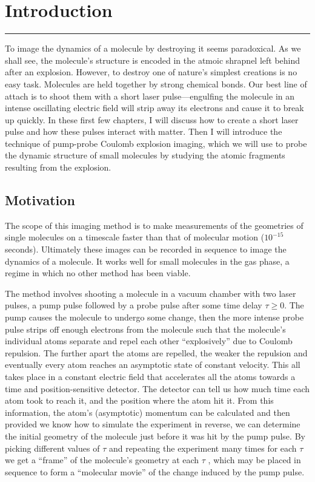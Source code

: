 \chapter{Introduction}\label{ch:introduction}

\vspace{-1.5 em}
\begin{addmargin}[-0.5cm]{0cm}
  \minitoc
\end{addmargin}
\hrule
\vspace{1.5 em}

To image the dynamics of a molecule by destroying it seems paradoxical. As we shall see, the molecule's structure is encoded in the atmoic shrapnel left behind after an explosion. However, to destroy one of nature's simplest creations is no easy task. Molecules are held together by strong chemical bonds. Our best line of attach is to shoot them with a short laser pulse---engulfing the molecule in an intense oscillating electric field will strip away its electrons and cause it to break up quickly. In these first few chapters, I will discuss how to create a short laser pulse and how these pulses interact with matter. Then I will introduce the technique of pump-probe Coulomb explosion imaging, which we will use to probe the dynamic structure of small molecules by studying the atomic fragments resulting from the explosion.

\section{Motivation}
The scope of this imaging method is to make measurements of the geometries of single molecules on a timescale faster than that of molecular motion ($10^{-15}$ seconds). Ultimately these images can be recorded in sequence to image the dynamics of a molecule. It works well for small molecules in the gas phase, a regime in which no other method has been viable.

The method involves shooting a molecule in a vacuum chamber with two laser pulses, a pump pulse followed by a probe pulse after some time delay $\tau \ge 0$. The pump causes the molecule to undergo some change, then the more intense probe pulse strips off enough electrons from the molecule such that the molecule's individual atoms separate and repel each other ``explosively'' due to Coulomb repulsion. The further apart the atoms are repelled, the weaker the repulsion and eventually every atom reaches an asymptotic state of constant velocity. This all takes place in a constant electric field that accelerates all the atoms towards a time and position-sensitive detector. The detector can tell us how much time each atom took to reach it, and the position where the atom hit it. From this information, the atom’s (asymptotic) momentum can be calculated and then provided we know how to simulate the experiment in reverse, we can determine the initial geometry of the molecule just before it was hit by the pump pulse. By picking different values of $\tau$ and repeating the experiment many times for each $\tau$ we get a ``frame'' of the molecule's geometry at each $\tau$ , which may be placed in sequence to form a ``molecular movie'' of the change induced by the pump pulse.

